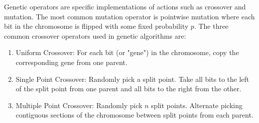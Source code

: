 Genetic operators are specific implementations of actions such as crossover and mutation. The most common mutation operator is pointwise mutation where each bit in the chromosome is flipped with some fixed probability $p$. The three common crossover operators used in genetic algorithms are:
\begin{enumerate}
  \item Uniform Crossover: For each bit (or "gene") in the chromosome, copy the corresponding gene from one parent.
  \item Single Point Crossover: Randomly pick a split point. Take all bits to the left of the split point from one parent and all bits to the right from the other.
  \item Multiple Point Crossover: Randomly pick $n$ split points. Alternate picking contiguous sections of the chromosome between split points from each parent.
\end{enumerate}


